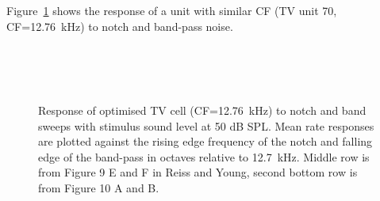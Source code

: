 
Figure~\ref{fig:TV_SweepUnit70} shows the response of a unit with similar CF (TV
unit 70, CF=12.76~kHz) to notch and band-pass noise. 

\begin{figure}[h!]
  \centering
  \\
  \\
  \\
  \caption{Response of optimised TV cell (CF=12.76~kHz) to notch and band sweeps with stimulus sound level at 50 dB SPL\@. Mean rate responses are plotted against the rising edge frequency of the notch and falling edge of the band-pass in octaves relative to 12.7~kHz. Middle row is from Figure 9 E and F in Reiss and Young, second bottom row is from Figure 10 A and B. }
  \label{fig:TV_SweepUnit70}
\end{figure}





